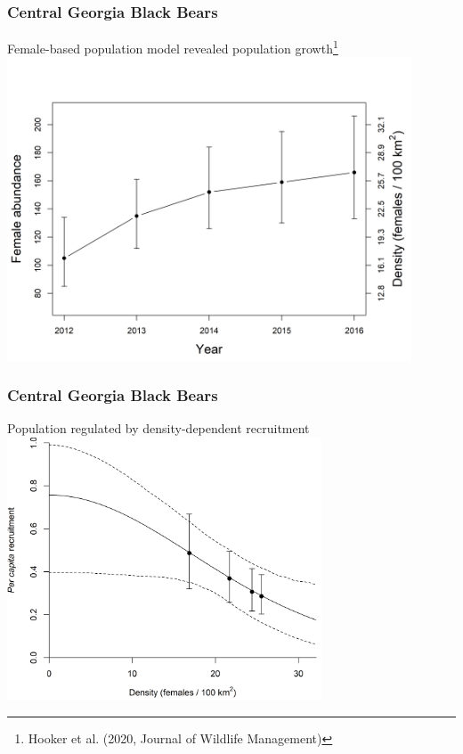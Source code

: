 \documentclass{beamer}\usepackage[]{graphicx}\usepackage[]{color}
\begin{document}
\begin{frame}
\begin{columns}
\begin{column}{0.5\textwidth}
    \end{column}
  \end{columns}
\end{frame}



\begin{frame}
  \frametitle{Central Georgia Black Bears}
  Female-based population model revealed population
  growth\footnote{Hooker et al. (2020, Journal of Wildlife Management)} \\
  \vfill
  \centering
  \includegraphics[width=0.9\textwidth]{figs/fig-5_abundance} \\
\end{frame}


\begin{frame}
  \frametitle{Central Georgia Black Bears}
  Population regulated by density-dependent recruitment \\
  \vfill
  \centering
  \includegraphics[width=0.7\textwidth]{figs/fig-3_dd-recruitment} \\
\end{frame}
\end{document}
